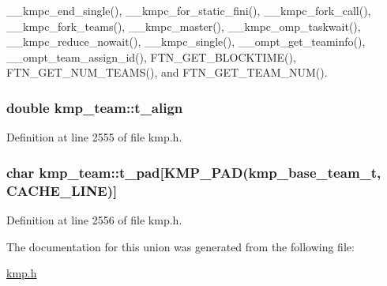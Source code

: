\-\_\-\-\_\-kmpc\-\_\-end\-\_\-single(), \-\_\-\-\_\-kmpc\-\_\-for\-\_\-static\-\_\-fini(), \-\_\-\-\_\-kmpc\-\_\-fork\-\_\-call(), \-\_\-\-\_\-kmpc\-\_\-fork\-\_\-teams(), \-\_\-\-\_\-kmpc\-\_\-master(), \-\_\-\-\_\-kmpc\-\_\-omp\-\_\-taskwait(), \-\_\-\-\_\-kmpc\-\_\-reduce\-\_\-nowait(), \-\_\-\-\_\-kmpc\-\_\-single(), \-\_\-\-\_\-ompt\-\_\-get\-\_\-teaminfo(), \-\_\-\-\_\-ompt\-\_\-team\-\_\-assign\-\_\-id(), F\-T\-N\-\_\-\-G\-E\-T\-\_\-\-B\-L\-O\-C\-K\-T\-I\-M\-E(), F\-T\-N\-\_\-\-G\-E\-T\-\_\-\-N\-U\-M\-\_\-\-T\-E\-A\-M\-S(), and F\-T\-N\-\_\-\-G\-E\-T\-\_\-\-T\-E\-A\-M\-\_\-\-N\-U\-M().

\hypertarget{unionkmp__team_a09ac6c7b4da00a15b684fbabf2dea4ff}{
\subsubsection[{t\-\_\-align}]{\setlength{\rightskip}{0pt plus 5cm}double kmp\-\_\-team\-::t\-\_\-align}}\label{unionkmp__team_a09ac6c7b4da00a15b684fbabf2dea4ff}


Definition at line 2555 of file kmp.\-h.

\hypertarget{unionkmp__team_afcf8e203e79dacf92fdb96af967044c0}{
\subsubsection[{t\-\_\-pad}]{\setlength{\rightskip}{0pt plus 5cm}char kmp\-\_\-team\-::t\-\_\-pad\mbox{[}{\bf K\-M\-P\-\_\-\-P\-A\-D}({\bf kmp\-\_\-base\-\_\-team\-\_\-t}, {\bf C\-A\-C\-H\-E\-\_\-\-L\-I\-N\-E})\mbox{]}}}\label{unionkmp__team_afcf8e203e79dacf92fdb96af967044c0}


Definition at line 2556 of file kmp.\-h.



The documentation for this union was generated from the following file\-:\begin{DoxyCompactItemize}
\item 
\hyperlink{kmp_8h}{kmp.\-h}\end{DoxyCompactItemize}
